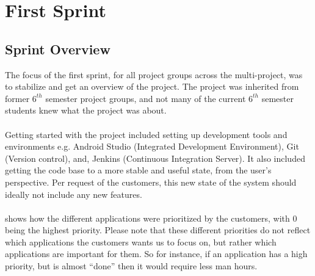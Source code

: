 \part{First Sprint}
\label{par:first_sprint}

\chapter{Sprint Overview}
The focus of the first sprint, for all project groups across the multi-project, was to stabilize and get an overview of the project. The project was inherited from former $6^{th}$ semester project groups, and not many of the current $6^{th}$ semester students knew what the \giraf project was about.
\\\\
Getting started with the project included setting up development tools and environments e.g. Android Studio (Integrated Development Environment), Git (Version control), and, Jenkins (Continuous Integration Server). It also included getting the code base to a more stable and useful state, from the user's perspective. Per request of the customers, this new state of the system should ideally not include any new features.
\\\\
 shows how the different applications were prioritized by the customers, with 0 being the highest priority. Please note that these different priorities do not reflect which applications the customers wants us to focus on, but rather which applications are important for them. So for instance, if an application has a high priority, but is almost ``done'' then it would require less man hours. 

